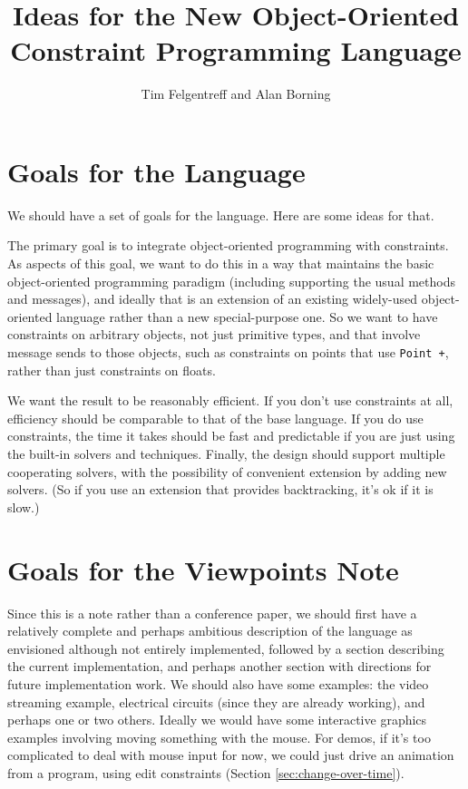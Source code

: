 \documentclass[11pt]{article}
\title{Ideas for the New Object-Oriented Constraint Programming Language}
\begin{document}
\author{Tim Felgentreff and Alan Borning}

\maketitle

\section{Goals for the Language}

We should have a set of goals for the language.  Here are some
ideas for that.

The primary goal is to integrate object-oriented programming with
constraints.  As aspects of this goal, we want to do this in a way
that maintains the basic object-oriented programming paradigm
(including supporting the usual methods and messages), and ideally
that is an extension of an existing widely-used object-oriented
language rather than a new special-purpose one.  So we want to have
constraints on arbitrary objects, not just primitive types, and that
involve message sends to those objects, such as constraints on points
that use \lstinline{Point +}, rather than just constraints on floats.

We want the result to be reasonably efficient.  If you don't use
constraints at all, efficiency should be comparable to that of the
base language.  If you do use constraints, the time it takes should be
fast and predictable if you are just using the built-in solvers and
techniques.  Finally, the design should support multiple cooperating
solvers, with the possibility of convenient extension by adding new
solvers.  (So if you use an extension that provides backtracking, it's
ok if it is slow.)
  
\section{Goals for the Viewpoints Note}

Since this is a note rather than a conference paper, we should first
have a relatively complete and perhaps ambitious description of the
language as envisioned although not entirely implemented, followed by
a section describing the current implementation, and perhaps another
section with directions for future implementation work.  We should
also have some examples: the video streaming example, electrical
circuits (since they are already working), and perhaps one or two
others.  Ideally we would have some interactive graphics examples
involving moving something with the mouse.  For demos, if it's too
complicated to deal with mouse input for now, we could just drive an
animation from a program, using edit constraints (Section
\ref{sec:change-over-time}).
\end{document}
